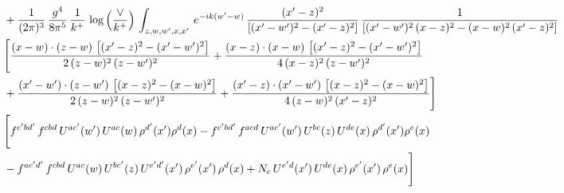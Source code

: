 \documentclass[9pt]{article}
\numberwithin{equation}{section}
\begin{document}
\begin{align}
& +\frac{1}{(2\pi)^{3}}\, \frac{g^{4}}{8\pi^{5}}\,\frac{1}{k^{+}}\,\log{\left(\frac{\vee}{k^{+}}\right)}\,\int_{z,w,w^{\prime},x,x'}\, e^{-ik(w^{\prime}-w)}\,\frac{(x'-z)^{2}}{\left[(x'-w')^{2}-(x'-z)^{2}\right]}\,\frac{1}{\left[(x'-w')^{2}\,(x-z)^{2} - (x-w)^{2}\,(x'-z)^{2}\right]}\notag \\ & \Bigg[\frac{(x-w)\cdot (z-w)\, \left[(x'-z)^{2}-(x'-w')^{2}\right]}{2\, (z-w)^{2}\, (z-w')^{2}}  + \frac{(x-z)\cdot (x-w)\,\left[(x'-z)^{2}-(x'-w')^{2}\right] }{4\,(x-z)^{2}\,(z-w')^{2}}\notag \\ & +\frac{(x'-w')\cdot (z-w')\, \left[(x-z)^{2}-(x-w)^{2}\right]}{2\, (z-w)^{2}\, (z-w')^{2}}+ \frac{(x'-z)\cdot (x'-w')\, \left[(x-z)^{2}-(x-w)^{2}\right]}{4\, (z-w)^{2}\,(x'-z)^{2}}\Bigg]\notag \\ &  \Bigg[f^{c'bd'}\,f^{cbd}\, U^{ac'}(w')\,U^{ac}(w)\,\rho^{d'}(x')\rho^{d}(x)- f^{c'bd'}\,f^{acd}\,U^{ac'}(w')\,U^{bc}(z)\,U^{de}(x)\,\rho^{d'}(x')\rho^{e}(x) \notag \\ & -f^{ac'd'}\,f^{cbd}\,U^{ac}(w)\,U^{bc'}(z)\,U^{e'd'}(x')\,\rho^{e'}(x')\,\rho^{d}(x) +N_{c}\,U^{e'd}(x')\,U^{de}(x)\,\rho^{e'}(x')\,\rho^{e}(x)\Bigg]
\end{align}
\end{document}
